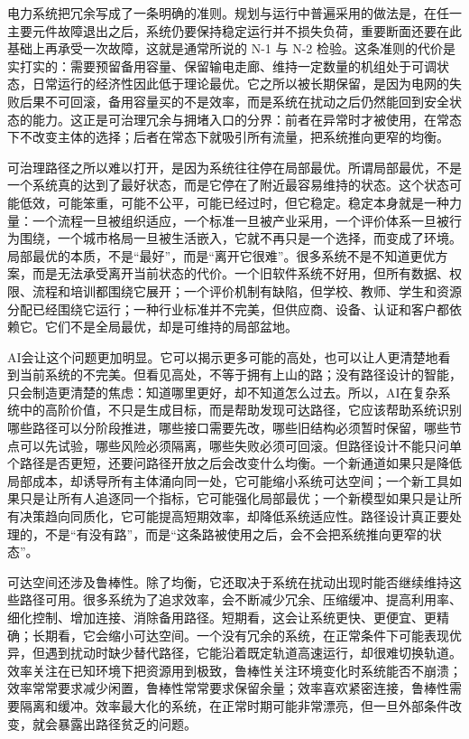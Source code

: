 电力系统把冗余写成了一条明确的准则。规划与运行中普遍采用的做法是，在任一主要元件故障退出之后，系统仍要保持稳定运行并不损失负荷，重要断面还要在此基础上再承受一次故障，这就是通常所说的 N-1 与 N-2 检验\cite{morison2004power}。这条准则的代价是实打实的：需要预留备用容量、保留输电走廊、维持一定数量的机组处于可调状态，日常运行的经济性因此低于理论最优。它之所以被长期保留，是因为电网的失败后果不可回滚，备用容量买的不是效率，而是系统在扰动之后仍然能回到安全状态的能力。这正是可治理冗余与拥堵入口的分界：前者在异常时才被使用，在常态下不改变主体的选择；后者在常态下就吸引所有流量，把系统推向更窄的均衡。


可治理路径之所以难以打开，是因为系统往往停在局部最优。所谓局部最优，不是一个系统真的达到了最好状态，而是它停在了附近最容易维持的状态。这个状态可能低效，可能笨重，可能不公平，可能已经过时，但它稳定。稳定本身就是一种力量：一个流程一旦被组织适应，一个标准一旦被产业采用，一个评价体系一旦被行为围绕，一个城市格局一旦被生活嵌入，它就不再只是一个选择，而变成了环境。局部最优的本质，不是“最好”，而是“离开它很难”。很多系统不是不知道更优方案，而是无法承受离开当前状态的代价。一个旧软件系统不好用，但所有数据、权限、流程和培训都围绕它展开；一个评价机制有缺陷，但学校、教师、学生和资源分配已经围绕它运行；一种行业标准并不完美，但供应商、设备、认证和客户都依赖它。它们不是全局最优，却是可维持的局部盆地。

AI会让这个问题更加明显。它可以揭示更多可能的高处，也可以让人更清楚地看到当前系统的不完美。但看见高处，不等于拥有上山的路；没有路径设计的智能，只会制造更清楚的焦虑：知道哪里更好，却不知道怎么过去。所以，AI在复杂系统中的高阶价值，不只是生成目标，而是帮助发现可达路径，它应该帮助系统识别哪些路径可以分阶段推进，哪些接口需要先改，哪些旧结构必须暂时保留，哪些节点可以先试验，哪些风险必须隔离，哪些失败必须可回滚。但路径设计不能只问单个路径是否更短，还要问路径开放之后会改变什么均衡。一个新通道如果只是降低局部成本，却诱导所有主体涌向同一处，它可能缩小系统可达空间；一个新工具如果只是让所有人追逐同一个指标，它可能强化局部最优；一个新模型如果只是让所有决策趋向同质化，它可能提高短期效率，却降低系统适应性。路径设计真正要处理的，不是“有没有路”，而是“这条路被使用之后，会不会把系统推向更窄的状态”。


可达空间还涉及鲁棒性。除了均衡，它还取决于系统在扰动出现时能否继续维持这些路径可用。很多系统为了追求效率，会不断减少冗余、压缩缓冲、提高利用率、细化控制、增加连接、消除备用路径。短期看，这会让系统更快、更便宜、更精确；长期看，它会缩小可达空间。一个没有冗余的系统，在正常条件下可能表现优异，但遇到扰动时缺少替代路径，它能沿着既定轨道高速运行，却很难切换轨道\cite{carlson1999highly}。效率关注在已知环境下把资源用到极致，鲁棒性关注环境变化时系统能否不崩溃；效率常常要求减少闲置，鲁棒性常常要求保留余量；效率喜欢紧密连接，鲁棒性需要隔离和缓冲。效率最大化的系统，在正常时期可能非常漂亮，但一旦外部条件改变，就会暴露出路径贫乏的问题。

